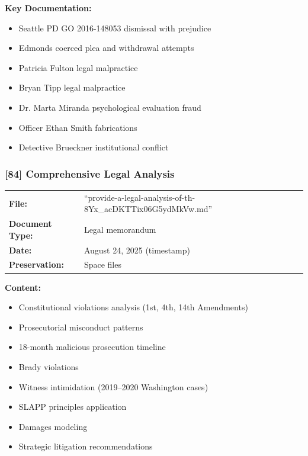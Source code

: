 \documentclass[11pt,letterpaper]{article}
\newcommand{\citeref}[1]{\textbf{\color{NavyBlue}[#1]}}
\begin{document}
\vspace{0.1in}

\textbf{Key Documentation:}
\begin{itemize}[leftmargin=*]
\item Seattle PD GO 2016-148053 dismissal with prejudice
\item Edmonds coerced plea and withdrawal attempts
\item Patricia Fulton legal malpractice
\item Bryan Tipp legal malpractice
\item Dr. Marta Miranda psychological evaluation fraud
\item Officer Ethan Smith fabrications
\item Detective Brueckner institutional conflict
\end{itemize}

\subsubsection{\citeref{84} Comprehensive Legal Analysis}

\begin{tabular}{@{}p{1.4in}p{4.6in}@{}}
\textbf{File:} & ``provide-a-legal-analysis-of-th-8Yx\_acDKTTix06G5ydMkVw.md''\\
\textbf{Document Type:} & Legal memorandum\\
\textbf{Date:} & August 24, 2025 (timestamp)\\
\textbf{Preservation:} & Space files\\
\end{tabular}

\vspace{0.1in}

\textbf{Content:}
\begin{itemize}[leftmargin=*]
\item Constitutional violations analysis (1st, 4th, 14th Amendments)
\item Prosecutorial misconduct patterns
\item 18-month malicious prosecution timeline
\item Brady violations
\item Witness intimidation (2019--2020 Washington cases)
\item SLAPP principles application
\item Damages modeling
\item Strategic litigation recommendations
\end{itemize}
\end{document}
